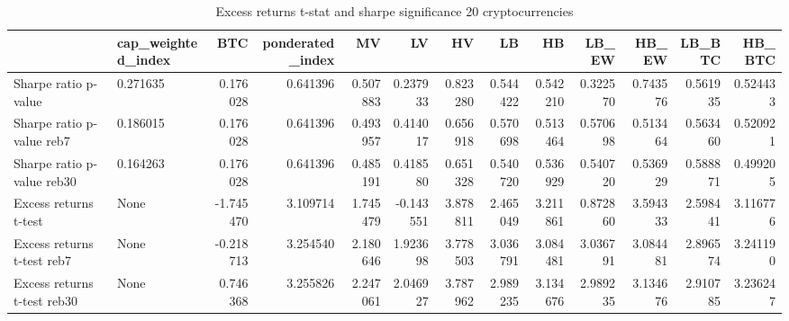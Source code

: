 \begin{table}
\centering
\caption{Excess returns t-stat and sharpe significance 20 cryptocurrencies}
\label{signif20_30}
\begin{tabular}{llrrrrrrrrrrr}
\toprule
{} & cap\_weighted\_index &       BTC &  ponderated\_index &        MV &        LV &        HV &        LB &        HB &     LB\_EW &     HB\_EW &    LB\_BTC &    HB\_BTC \\
\midrule
Sharpe ratio p-value        &           0.271635 &  0.176028 &          0.641396 &  0.507883 &  0.237933 &  0.823280 &  0.544422 &  0.542210 &  0.322570 &  0.743576 &  0.561935 &  0.524433 \\
Sharpe ratio p-value reb7   &           0.186015 &  0.176028 &          0.641396 &  0.493957 &  0.414017 &  0.656918 &  0.570698 &  0.513464 &  0.570698 &  0.513464 &  0.563460 &  0.520921 \\
Sharpe ratio p-value reb30  &           0.164263 &  0.176028 &          0.641396 &  0.485191 &  0.418580 &  0.651328 &  0.540720 &  0.536929 &  0.540720 &  0.536929 &  0.588871 &  0.499205 \\
Excess returns t-test       &               None & -1.745470 &          3.109714 &  1.745479 & -0.143551 &  3.878811 &  2.465049 &  3.211861 &  0.872860 &  3.594333 &  2.598441 &  3.116776 \\
Excess returns t-test reb7  &               None & -0.218713 &          3.254540 &  2.180646 &  1.923698 &  3.778503 &  3.036791 &  3.084481 &  3.036791 &  3.084481 &  2.896574 &  3.241190 \\
Excess returns t-test reb30 &               None &  0.746368 &          3.255826 &  2.247061 &  2.046927 &  3.787962 &  2.989235 &  3.134676 &  2.989235 &  3.134676 &  2.910785 &  3.236247 \\
\bottomrule
\end{tabular}
\end{table}
